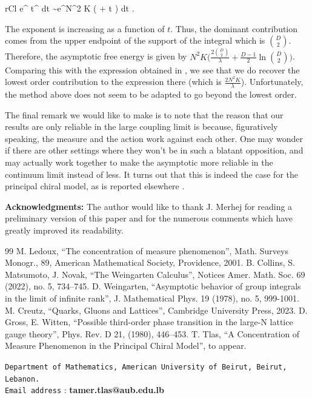 \documentclass[twoside, a4paper,10pt]{article}
\newcommand{\besn}{\begin{IEEEeqnarray*}{rCl}}
\newcommand{\eesn}{\end{IEEEeqnarray*}}
\begin{document}
\besn
\int e^{       } t^{      } dt  \sim  \int e^{N^2 K (        +   \ln t )  }    dt .
\eesn

The exponent is increasing as a function of $t$. Thus, the dominant contribution comes from the upper endpoint of the support of the integral which is ${D \choose 2}$. Therefore, the asymptotic free energy is given by $ N^2 K \Big ( \frac{ 2 {D \choose 2}  }{ \lambda   }   + \frac{D-1}{2} \ln {D \choose 2}   \Big )$. Comparing this with the expression obtained in \cite{grosswitten}, we see that we do recover the lowest order contribution to the expression there (which is $\frac{2N^2 K}{\lambda}$). Unfortunately, the method above does not seem to be adapted to go beyond the lowest order. \newline

The final remark we would like to make is to note that the reason that our results are only reliable in the large coupling limit is because, figuratively speaking, the measure and the action work against each other. One may wonder if there are other settings where they won't be in such a blatant opposition, and may actually work together to make the asymptotic more reliable in the continuum limit instead of less. It turns out that this is indeed the case for the principal chiral model, as is reported elsewhere \cite{pcm}. \newline

\textbf{Acknowledgments:} The author would like to thank J. Merhej for reading a preliminary version of this paper and for the numerous comments which have greatly improved its readability.


\begin{thebibliography}{99}
 M. Ledoux, ``The concentration of measure phenomenon'', Math. Surveys Monogr., 89, American Mathematical Society, Providence, 2001.
 B. Collins, S. Matsumoto, J. Novak, ``The Weingarten Calculus'', Notices Amer. Math. Soc. 69 (2022), no. 5, 734--745. 
 D. Weingarten, ``Asymptotic behavior of group integrals in the limit of infinite rank'', J. Mathematical Phys. 19 (1978), no. 5, 999-1001.
 M. Creutz, ``Quarks, Gluons and Lattices'', Cambridge University Press, 2023.
 D. Gross, E. Witten, ``Possible third-order phase transition in the large-N lattice gauge theory'', Phys. Rev. D 21, (1980), 446--453.
 T. Tlas, ``A Concentration of Measure Phenomenon in the Principal Chiral Model'', to appear.
\end{thebibliography}




\texttt{{\footnotesize Department of Mathematics, American University of Beirut, Beirut, Lebanon.}
}\\ \texttt{\footnotesize{Email address}} : \textbf{\footnotesize{tamer.tlas@aub.edu.lb}} 
\end{document}
